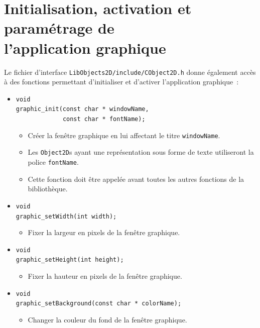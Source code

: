 \documentclass[12pt]{article}
\begin{document}

\newpage
\section{Initialisation, activation et param\'etrage de\\
         l'application graphique}

Le fichier d'interface \verb!LibObjects2D/include/CObject2D.h!
donne \'egalement acc\`es \`a des fonctions
permettant d'initialiser et d'activer l'application graphique~:

\begin{itemize}
\item \verb!void! \\
      \verb!graphic_init(const char * windowName,! \\
      \verb!             const char * fontName);!
      \begin{itemize}
      \item Cr\'eer la fen\^etre graphique en lui affectant le titre
            \verb!windowName!.
      \item Les \verb!Object2D!s ayant une repr\'esentation sous forme
            de texte utiliseront la police \verb!fontName!.
      \item Cette fonction doit \^etre appel\'ee avant toutes les autres
            fonctions de la bi\-blio\-th\`eque.
      \end{itemize}
\item \verb!void! \\
      \verb!graphic_setWidth(int width);!
      \begin{itemize}
      \item Fixer la largeur en pixels de la fen\^etre graphique.
      \end{itemize}
\item \verb!void! \\
      \verb!graphic_setHeight(int height);!
      \begin{itemize}
      \item Fixer la hauteur en pixels de la fen\^etre graphique.
      \end{itemize}
\item \verb!void! \\
      \verb!graphic_setBackground(const char * colorName);!
      \begin{itemize}
      \item Changer la couleur du fond de la fen\^etre graphique.

\end{itemize}
\end{itemize}
\end{document}
